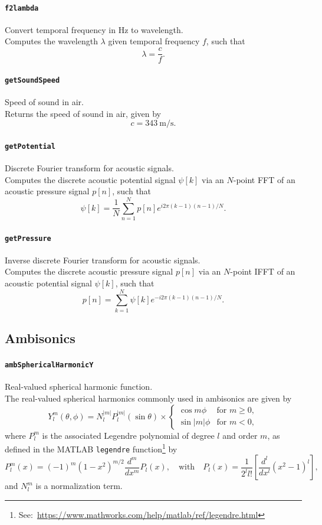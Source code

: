 \documentclass[11pt, oneside]{article}
\newcommand{\function}[1]{\paragraph*{\texttt{#1}}}
\begin{document}
\function{f2lambda} Convert temporal frequency in Hz to wavelength. \\
Computes the wavelength $\lambda$ given temporal frequency $f$, such that
\begin{equation}
\lambda = \frac{c}{f}.
\end{equation}

\function{getSoundSpeed} Speed of sound in air. \\
Returns the speed of sound in air, given by
\begin{equation}
c = 343~\text{m/s}.
\end{equation}

\function{getPotential} Discrete Fourier transform for acoustic signals. \\
Computes the discrete acoustic potential signal $\psi[k]$ via an $N$-point FFT of an acoustic pressure signal $p[n]$, such that
\begin{equation}
\psi[k] = \frac{1}{N} \sum_{n=1}^N p[n] e^{i 2 \pi (k-1)(n-1) / N}.
\end{equation}

\function{getPressure} Inverse discrete Fourier transform for acoustic signals. \\
Computes the discrete acoustic pressure signal $p[n]$ via an $N$-point IFFT of an acoustic potential signal $\psi[k]$, such that
\begin{equation}
p[n] = \sum_{k=1}^N \psi[k] e^{-i 2 \pi (k-1)(n-1) / N}.
\end{equation}

\subsection{Ambisonics}

\function{ambSphericalHarmonicY} Real-valued spherical harmonic function. \\
The real-valued spherical harmonics commonly used in ambisonics are given by~\citet[section~2.2]{Zotter2009PhD}
\begin{equation}\label{eq:ambSphericalHarmonicY}
Y_l^m(\theta,\phi) = N_l^{|m|} P_l^{|m|} (\sin \theta) \times
    \begin{cases}
	\cos m \phi & \textrm{for } m \geq 0,\\
	\sin |m| \phi & \textrm{for } m < 0,
    \end{cases}
\end{equation}
where $P_l^m$ is the associated Legendre polynomial of degree $l$ and order $m$, as defined in the MATLAB \texttt{legendre} function\footnote{See:~\url{https://www.mathworks.com/help/matlab/ref/legendre.html}} by
\begin{equation}
P_l^m(x) = (-1)^m (1 - x^2)^{m/2} \frac{d^m}{dx^m} P_l(x), \quad
\textrm{with} \quad
P_l(x) = \frac{1}{2^l l!} \left[ \frac{d^l}{dx^l}(x^2 - 1)^l \right],
\end{equation}
and $N_l^m$ is a normalization term.
\end{document}

